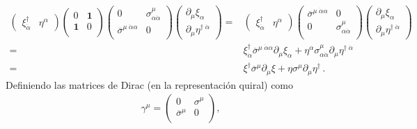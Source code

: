 \begin{align}
\label{eq:psidd}
  \begin{pmatrix}
  \xi^{\dagger}_{\dot{\alpha}}& \eta^{\alpha}
  \end{pmatrix}
 \begin{pmatrix}
    0           &\mathbf{1}\\
    \mathbf{1} &0\\
  \end{pmatrix}
  \begin{pmatrix}
    0           &\sigma^{\mu}_{\alpha\dot{\alpha}}\\
    \overline{\sigma}^{\mu\;\dot{\alpha}\alpha} &0\\
  \end{pmatrix} \begin{pmatrix}
   \partial_{\mu}\xi_{\alpha}\\
   \partial_{\mu}\eta^{\dagger\;\dot{\alpha}}    
  \end{pmatrix}
=&
 \begin{pmatrix}
  \xi^{\dagger}_{\dot{\alpha}}& \eta^{\alpha}
  \end{pmatrix}
  \begin{pmatrix}
    \overline{\sigma}^{\mu\;\dot{\alpha}\alpha}&0\\
     0                    &\sigma^{\mu}_{\alpha\dot{\alpha}}\\
  \end{pmatrix} \begin{pmatrix}
   \partial_{\mu}\xi_{\alpha}\\
   \partial_{\mu}\eta^{\dagger\;\dot{\alpha}}    
  \end{pmatrix}\nonumber\\
=&\xi^{\dagger}_{\dot{\alpha}}\overline{\sigma}^{\mu\;\dot{\alpha}\alpha}\partial_{\mu}\xi_{\alpha}+\eta^{\alpha}\sigma^{\mu}_{\alpha\dot{\alpha}}\partial_{\mu}\eta^{\dagger\;\dot{\alpha}}\nonumber\\
=&\xi^{\dagger}\overline{\sigma}^{\mu}\partial_{\mu}\xi+\eta\sigma^{\mu}\partial_{\mu}\eta^{\dagger}\,.
\end{align}
Definiendo las matrices de Dirac (en la representación quiral) como
\begin{align}
  \gamma^\mu= \begin{pmatrix}
    0           &\sigma^{\mu}\\
    \overline{\sigma}^{\mu} &0\\
  \end{pmatrix},
\end{align}
